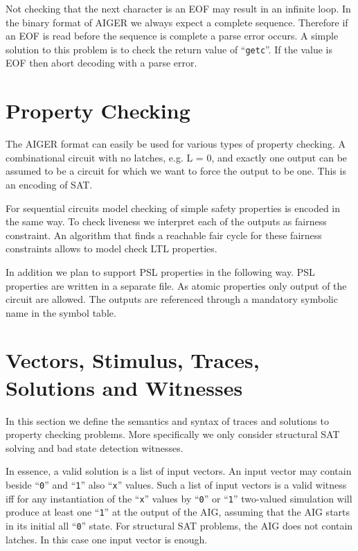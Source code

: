 \documentclass{llncs}
\begin{document}
  Not checking that the next character is an EOF may result in an infinite
  loop.  In the binary format of AIGER we always expect a complete sequence.
  Therefore if an EOF is read before the sequence is complete a parse error
  occurs.  A simple solution to this problem is to check the return value of
  ``\texttt{getc}''.  If the value is EOF then abort decoding with a parse error.

\section{Property Checking}
  
  The AIGER format can easily be used for various types of property
  checking.  A combinational circuit with no latches, e.g. L = 0, and
  exactly one output can be assumed to be a circuit for which we want to
  force the output to be one.  This is an encoding of SAT.

  For sequential circuits model checking of simple safety properties is
  encoded in the same way.  To check liveness we interpret each of the
  outputs as fairness constraint.  An algorithm that finds a reachable fair
  cycle for these fairness constraints allows to model check LTL properties.

  In addition we plan to support PSL properties in the following way.
  PSL properties are written in a separate file.  As atomic properties
  only output of the circuit are allowed.  The outputs are referenced
  through a mandatory symbolic name in the symbol table.

\section{Vectors, Stimulus, Traces, Solutions and Witnesses}

  In this section we define the semantics and syntax of traces and solutions
  to property checking problems.  More specifically we only consider
  structural SAT solving and bad state detection witnesses.
  
  In essence, a valid solution is a list of input vectors. An input vector
  may contain beside ``\texttt{0}'' and ``\texttt{1}'' also ``\texttt{x}'' values.  Such a list of input
  vectors is a valid witness iff for any instantiation of the ``\texttt{x}'' values by
  ``\texttt{0}'' or ``\texttt{1}'' two-valued simulation will produce at least one
  ``\texttt{1}'' at the
  output of the AIG, assuming that the AIG starts in its initial all ``\texttt{0}''
  state.  For structural SAT problems, the AIG does not contain latches.
  In this case one input vector is enough.
\end{document}
